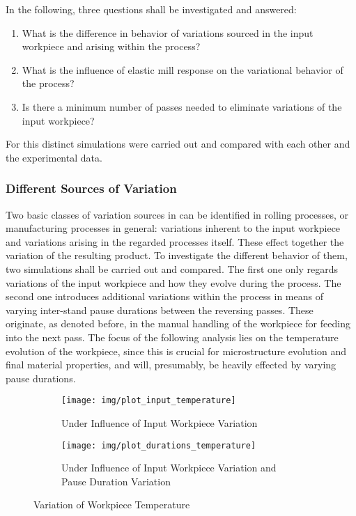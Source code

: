 In the following, three questions shall be investigated and answered:
\begin{enumerate}
    \item What is the difference in behavior of variations sourced in the input workpiece and arising within the process?
    \item What is the influence of elastic mill response on the variational behavior of the process?
    \item Is there a minimum number of passes needed to eliminate variations of the input workpiece?
\end{enumerate}

For this distinct simulations were carried out and compared with each other and the experimental data.

\subsubsection{Different Sources of Variation}\label{subsubsec:different-sources-of-variation}

Two basic classes of variation sources in can be identified in rolling processes, or manufacturing processes in general: variations inherent to the input workpiece and variations arising in the regarded processes itself.
These effect together the variation of the resulting product.
To investigate the different behavior of them, two simulations shall be carried out and compared.
The first one only regards variations of the input workpiece and how they evolve during the process.
The second one introduces additional variations within the process in means of varying inter-stand pause durations between the reversing passes.
These originate, as denoted before, in the manual handling of the workpiece for feeding into the next pass.
The focus of the following analysis lies on the temperature evolution of the workpiece, since this is crucial for microstructure evolution and final material properties, and will, presumably, be heavily effected by varying pause durations.

\begin{figure}
    \begin{subfigure}{\linewidth}
        \centering
        \texttt{[image: img/plot\_input\_temperature]}
        \caption{Under Influence of Input Workpiece Variation}
        \label{fig:plot_input_temperature}
    \end{subfigure}
    \begin{subfigure}{\linewidth}
        \centering
        \texttt{[image: img/plot\_durations\_temperature]}
        \caption{Under Influence of Input Workpiece Variation and Pause Duration Variation}
        \label{fig:plot_durations_temperature}
    \end{subfigure}
    \caption{Variation of Workpiece Temperature}
\end{figure}


